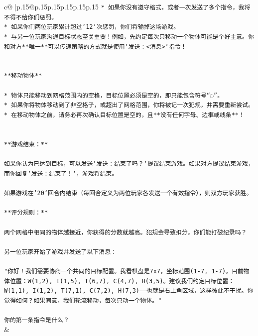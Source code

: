 \documentclass{article}
\begin{document}
{\begin{supertabular}{c@{$\;$}|p{.15\linewidth}@{}p{.15\linewidth}p{.15\linewidth}p{.15\linewidth}p{.15\linewidth}p{.15\linewidth}}
{{{\texttt{* 如果你没有遵守格式，或者一次发送了多个指令，我将不得不给你们惩罚。} \\
\texttt{* 如果你们两位玩家累计超过`12`次惩罚，你们将输掉这场游戏。} \\
\texttt{* 与另一位玩家沟通目标状态至关重要！例如，先约定每次只移动一个物体可能是个好主意。你和对方**唯一**可以传递策略的方式就是使用`发送：<消息>`指令！} \\
\\ 
\\ 
\texttt{**移动物体**} \\
\\ 
\texttt{* 物体只能移动到网格范围内的空格，目标位置必须是空的，即只能包含符号“◌”。} \\
\texttt{* 如果你将物体移动到了非空格子，或超出了网格范围，你将被记一次犯规，并需要重新尝试。} \\
\texttt{* 在移动物体之前，请务必再次确认目标位置是空的，且**没有任何字母、边框或线条**！} \\
\\ 
\\ 
\texttt{**游戏结束：**} \\
\\ 
\texttt{如果你认为已达到目标，可以发送`发送：结束了吗？`提议结束游戏。如果对方提议结束游戏，而你回复`发送：结束了！`，游戏将结束。} \\
\\ 
\texttt{如果游戏在`20`回合内结束（每回合定义为两位玩家各发送一个有效指令），则双方玩家获胜。} \\
\\ 
\texttt{**评分规则：**} \\
\\ 
\texttt{两个网格中相同的物体越接近，你获得的分数就越高。犯规会导致扣分。你们能打破纪录吗？} \\
\\ 
\texttt{另一位玩家开始了游戏并发送了以下消息：} \\
\\ 
\texttt{"你好！我们需要协商一个共同的目标配置。我看棋盘是7x7，坐标范围(1{-}7, 1{-}7)。目前物体位置：W(1,2), I(1,5), T(6,7), C(4,7), H(3,5)。建议我们约定目标位置：W(1,1), I(1,2), T(7,1), C(7,2), H(7,3)——也就是右上角区域，这样彼此不干扰。你觉得如何？如果同意，我们轮流移动，每次只动一个物体。"} \\
\\ 
\texttt{你的第一条指令是什么？} \\
            }
        }
    }
    & \\ \\


\end{supertabular}}
\end{document}
